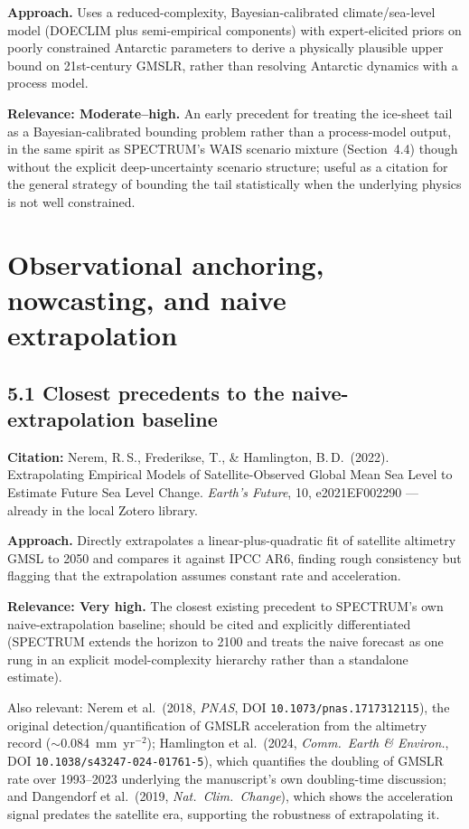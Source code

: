 \documentclass[11pt]{article}
\begin{document}
\noindent\textbf{Approach.} Uses a reduced-complexity, Bayesian-calibrated
climate/sea-level model (DOECLIM plus semi-empirical components) with
expert-elicited priors on poorly constrained Antarctic parameters to derive
a physically plausible upper bound on 21st-century GMSLR, rather than
resolving Antarctic dynamics with a process model.

\noindent\textbf{Relevance: Moderate--high.} An early precedent for treating
the ice-sheet tail as a Bayesian-calibrated bounding problem rather than a
process-model output, in the same spirit as SPECTRUM's WAIS scenario
mixture (Section~4.4) though without the explicit deep-uncertainty scenario
structure; useful as a citation for the general strategy of bounding the
tail statistically when the underlying physics is not well constrained.

\section{Observational anchoring, nowcasting, and naive extrapolation}

\subsection*{5.1 Closest precedents to the naive-extrapolation baseline}

\noindent\textbf{Citation:} Nerem, R.\,S., Frederikse, T., \&
Hamlington, B.\,D.\ (2022). Extrapolating Empirical Models of
Satellite-Observed Global Mean Sea Level to Estimate Future Sea Level
Change. \textit{Earth's Future}, 10, e2021EF002290 --- already in the local
Zotero library.

\noindent\textbf{Approach.} Directly extrapolates a linear-plus-quadratic
fit of satellite altimetry GMSL to 2050 and compares it against IPCC AR6,
finding rough consistency but flagging that the extrapolation assumes
constant rate and acceleration.

\noindent\textbf{Relevance: Very high.} The closest existing precedent to
SPECTRUM's own naive-extrapolation baseline; should be cited and explicitly
differentiated (SPECTRUM extends the horizon to 2100 and treats the naive
forecast as one rung in an explicit model-complexity hierarchy rather than
a standalone estimate).

\noindent Also relevant: Nerem et al.\ (2018, \textit{PNAS}, DOI
\texttt{10.1073/pnas.1717312115}), the original detection/quantification of
GMSLR acceleration from the altimetry record ($\sim$0.084~mm~yr$^{-2}$);
Hamlington et al.\ (2024, \textit{Comm.\ Earth \& Environ.}, DOI
\texttt{10.1038/s43247-024-01761-5}), which quantifies the doubling of GMSLR
rate over 1993--2023 underlying the manuscript's own doubling-time
discussion; and Dangendorf et al.\ (2019, \textit{Nat.\ Clim.\ Change}),
which shows the acceleration signal predates the satellite era, supporting
the robustness of extrapolating it.
\end{document}

